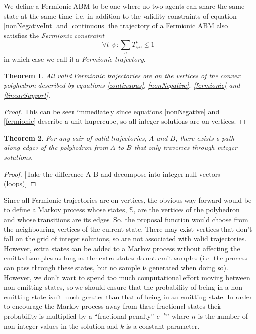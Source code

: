 \documentclass{article}
\newtheorem{theorem}{Theorem}
\begin{document}
We define a Fermionic ABM to be one where no two agents can share the same state at the same time. i.e. in addition to the validity constraints of equation \ref{nonNegativeInt} and \ref{continuous} the trajectory of a Fermionic ABM also satisfies the \textit{Fermionic constraint}
\begin{equation}
\forall t,\psi: \sum_a T^t_{\psi a} \le 1
\label{fermionic}
\end{equation}
in which case we call it a \textit{Fermionic trajectory}.

\begin{theorem}
All valid Fermionic trajectories are on the vertices of the convex polyhedron described by equations \ref{continuous}, \ref{nonNegative}, \ref{fermionic} and \ref{linearSupport}.
\end{theorem}
\begin{proof}
This can be seen immediately since equations \ref{nonNegative} and \ref{fermionic} describe a unit hupercube, so all integer solutions are on vertices.
\end{proof}

\begin{theorem}
For any pair of valid trajectories, $A$ and $B$, there exists a path along edges of the polyhedron from $A$ to $B$ that only traverses through integer solutions.
\end{theorem}
\begin{proof}

[Take the difference A-B and decompose into integer null vectors (loops)]

\end{proof}

Since all Fermionic trajectories are on vertices, the obvious way forward would be to define a Markov process whose states, $\mathbb{S}$, are the vertices of the polyhedron and whose transitions are its edges. So, the proposal function would choose from the neighbouring vertices of the current state. There may exist vertices that don't fall on the grid of integer solutions, so are not associated with valid trajectories. However, extra states can be added to a Markov process without affecting the emitted samples as long as the extra states do not emit samples (i.e. the process can pass through these states, but no sample is generated when doing so). However, we don't want to spend too much computational effort moving between non-emitting states, so we should ensure that the probability of being in a non-emitting state isn't much greater than that of being in an emitting state. In order to encourage the Markov process away from these fractional states their probability is multiplied by a ``fractional penalty'' $e^{-kn}$ where $n$ is the number of non-integer values in the solution and $k$ is a constant parameter.
\end{document}
